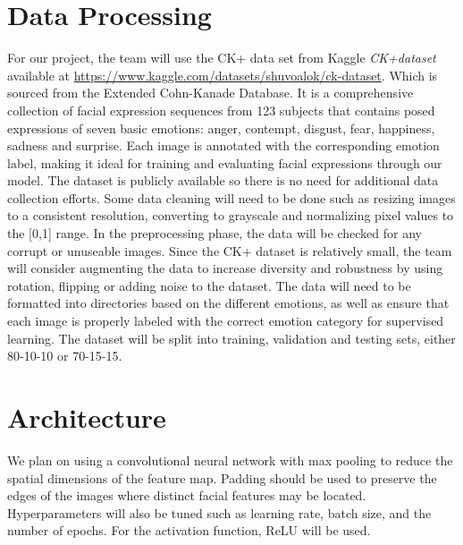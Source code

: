 \documentclass{article} %
\begin{document}
\section{Data Processing}
For our project, the team will use the CK+ data set from Kaggle
\textit{CK+dataset} \cite{Dev-ShuvoAlok} available at
\url{https://www.kaggle.com/datasets/shuvoalok/ck-dataset}. Which is sourced from the Extended Cohn-Kanade Database. It is a comprehensive collection of facial expression sequences from 123 subjects that contains posed expressions of seven basic emotions: anger, contempt, disgust, fear, happiness, sadness and surprise. Each image is annotated with the corresponding emotion label, making it ideal for training and evaluating facial expressions through our model. 
The dataset is publicly available so there is no need for additional data collection efforts.
Some data cleaning will need to be done such as resizing images to a consistent resolution, converting to grayscale and normalizing pixel values to the [0,1] range. In the preprocessing phase, the data will be checked for any corrupt or unuseable images.
Since the CK+ dataset is relatively small, the team will consider augmenting the data to increase diversity and robustness by using rotation, flipping or adding noise to the dataset.
The data will need to be formatted into directories based on the different emotions, as well as ensure that each image is properly labeled with the correct emotion category for supervised learning.
The dataset will be split into training, validation and testing sets, either 80-10-10 or 70-15-15.

\section{Architecture}
We plan on using a convolutional neural network with max pooling to reduce the spatial dimensions of the feature map. Padding should be used to preserve the edges of the images where distinct facial features may be located. Hyperparameters will also be tuned such as learning rate, batch size, and the number of epochs. For the activation function, ReLU will be used.
\end{document}

